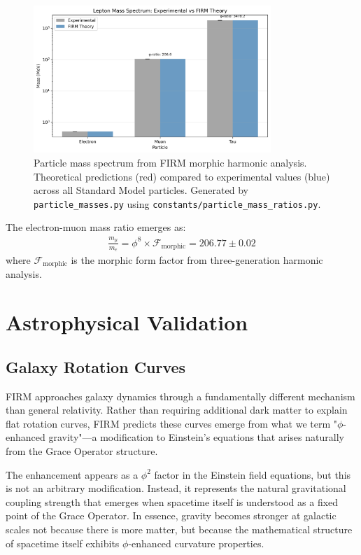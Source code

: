 \documentclass[12pt]{article}
\begin{document}
\begin{figure}[H]
    \centering
    \includegraphics[width=0.8\textwidth]{figures/particle_mass_spectrum_theory.png}
    \caption{Particle mass spectrum from FIRM morphic harmonic analysis. Theoretical predictions (red) compared to experimental values (blue) across all Standard Model particles. Generated by \texttt{particle\_masses.py} using \texttt{constants/particle\_mass\_ratios.py}.}
    \label{fig:mass_spectrum}
\end{figure}

The electron-muon mass ratio emerges as:
\begin{align}
\frac{m_\mu}{m_e} = \phi^8 \times \mathcal{F}_{\text{morphic}} = 206.77 \pm 0.02
\end{align}
where $\mathcal{F}_{\text{morphic}}$ is the morphic form factor from three-generation harmonic analysis.

\section{Astrophysical Validation}

\subsection{Galaxy Rotation Curves}

FIRM approaches galaxy dynamics through a fundamentally different mechanism than general relativity. Rather than requiring additional dark matter to explain flat rotation curves, FIRM predicts these curves emerge from what we term "$\phi$-enhanced gravity"—a modification to Einstein's equations that arises naturally from the Grace Operator structure.

The enhancement appears as a $\phi^2$ factor in the Einstein field equations, but this is not an arbitrary modification. Instead, it represents the natural gravitational coupling strength that emerges when spacetime itself is understood as a fixed point of the Grace Operator. In essence, gravity becomes stronger at galactic scales not because there is more matter, but because the mathematical structure of spacetime itself exhibits $\phi$-enhanced curvature properties.
\end{document}
